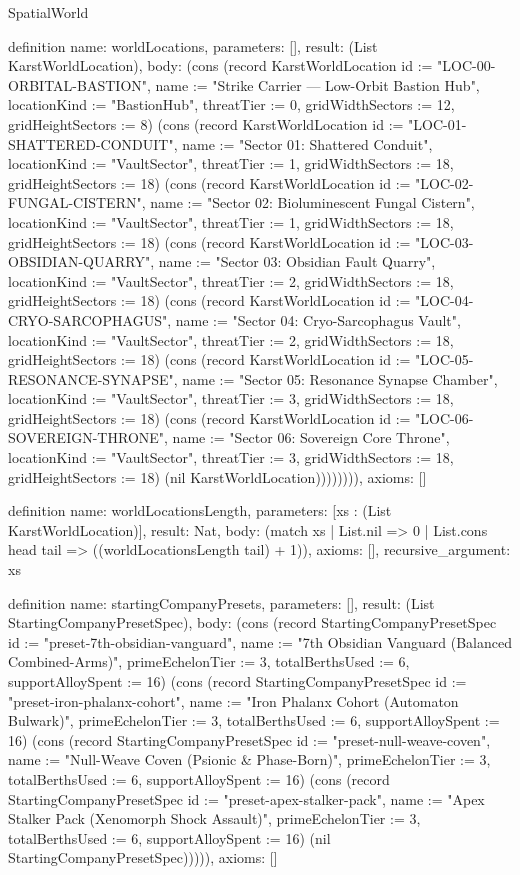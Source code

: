 \begin{lexlean}{SpatialWorld}
\begin{semanticmodule}
definition{
  name: worldLocations,
  parameters: [],
  result: (List KarstWorldLocation),
  body: (cons (record KarstWorldLocation {id := "LOC-00-ORBITAL-BASTION", name := "Strike Carrier — Low-Orbit Bastion Hub", locationKind := "BastionHub", threatTier := 0, gridWidthSectors := 12, gridHeightSectors := 8}) (cons (record KarstWorldLocation {id := "LOC-01-SHATTERED-CONDUIT", name := "Sector 01: Shattered Conduit", locationKind := "VaultSector", threatTier := 1, gridWidthSectors := 18, gridHeightSectors := 18}) (cons (record KarstWorldLocation {id := "LOC-02-FUNGAL-CISTERN", name := "Sector 02: Bioluminescent Fungal Cistern", locationKind := "VaultSector", threatTier := 1, gridWidthSectors := 18, gridHeightSectors := 18}) (cons (record KarstWorldLocation {id := "LOC-03-OBSIDIAN-QUARRY", name := "Sector 03: Obsidian Fault Quarry", locationKind := "VaultSector", threatTier := 2, gridWidthSectors := 18, gridHeightSectors := 18}) (cons (record KarstWorldLocation {id := "LOC-04-CRYO-SARCOPHAGUS", name := "Sector 04: Cryo-Sarcophagus Vault", locationKind := "VaultSector", threatTier := 2, gridWidthSectors := 18, gridHeightSectors := 18}) (cons (record KarstWorldLocation {id := "LOC-05-RESONANCE-SYNAPSE", name := "Sector 05: Resonance Synapse Chamber", locationKind := "VaultSector", threatTier := 3, gridWidthSectors := 18, gridHeightSectors := 18}) (cons (record KarstWorldLocation {id := "LOC-06-SOVEREIGN-THRONE", name := "Sector 06: Sovereign Core Throne", locationKind := "VaultSector", threatTier := 3, gridWidthSectors := 18, gridHeightSectors := 18}) (nil KarstWorldLocation)))))))),
  axioms: []
}

definition{
  name: worldLocationsLength,
  parameters: [xs : (List KarstWorldLocation)],
  result: Nat,
  body: (match xs
    | List.nil => 0
    | List.cons head tail => ((worldLocationsLength tail) + 1)),
  axioms: [],
  recursive_argument: xs
}

definition{
  name: startingCompanyPresets,
  parameters: [],
  result: (List StartingCompanyPresetSpec),
  body: (cons (record StartingCompanyPresetSpec {id := "preset-7th-obsidian-vanguard", name := "7th Obsidian Vanguard (Balanced Combined-Arms)", primeEchelonTier := 3, totalBerthsUsed := 6, supportAlloySpent := 16}) (cons (record StartingCompanyPresetSpec {id := "preset-iron-phalanx-cohort", name := "Iron Phalanx Cohort (Automaton Bulwark)", primeEchelonTier := 3, totalBerthsUsed := 6, supportAlloySpent := 16}) (cons (record StartingCompanyPresetSpec {id := "preset-null-weave-coven", name := "Null-Weave Coven (Psionic & Phase-Born)", primeEchelonTier := 3, totalBerthsUsed := 6, supportAlloySpent := 16}) (cons (record StartingCompanyPresetSpec {id := "preset-apex-stalker-pack", name := "Apex Stalker Pack (Xenomorph Shock Assault)", primeEchelonTier := 3, totalBerthsUsed := 6, supportAlloySpent := 16}) (nil StartingCompanyPresetSpec))))),
  axioms: []
}


\end{semanticmodule}
\end{lexlean}
